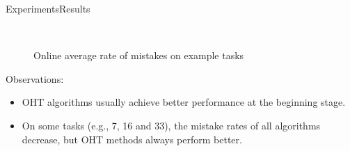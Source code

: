 \documentclass{beamer}
\begin{document}
\begin{frame}{Experiments}{Results}
\begin{figure}
\centering
  \\
  \caption{Online average rate of mistakes on example tasks}
\end{figure}
\begin{footnotesize}
Observations:
\begin{itemize}
\item
OHT algorithms usually achieve better performance at the beginning stage.
\item
On some tasks (e.g., 7, 16 and 33), the mistake rates of all algorithms decrease, but OHT methods always perform better.
\end{itemize}
\end{footnotesize}
\end{frame}
\end{document}
